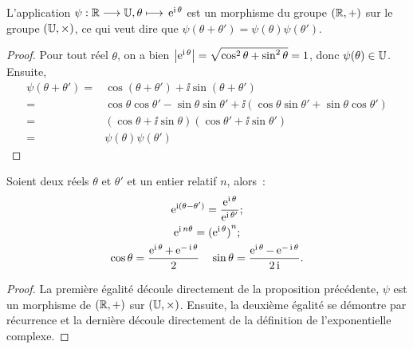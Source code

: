 \begin{prop}
  L'application \(\psi:\mathbb{R} \longrightarrow{} \mathbb{U}, \theta \longmapsto{} \operatorname{e}^{\operatorname{i} \theta}\) est un 
  morphisme du groupe \((\mathbb{R}, + )\) sur le groupe \((\mathbb{U},\times)\), ce qui veut 
  dire que \(\psi(\theta + \theta') = \psi(\theta)\psi(\theta')\).
\end{prop}

\begin{proof}
  Pour tout réel \(\theta\), on a bien \(\left\lvert\operatorname{e}^{\operatorname{i} \theta}\right\rvert = \sqrt{\cos^2 
  \theta + \sin^2 \theta} = 1\), donc \(\psi(\theta) \in{}\mathbb{U}\). Ensuite,
  \begin{align*}
    \psi(\theta  + \theta') = &\cos(\theta  + \theta') + \ii{}\sin(\theta + 
    \theta')\\
    = &\cos \theta \cos \theta' - \sin \theta \sin \theta'  + \ii(\cos 
    \theta \sin \theta' + \sin \theta \cos \theta')\\
    = &(\cos \theta + \ii{}\sin \theta)(\cos \theta' + \ii{}\sin \theta')\\
    = &\psi(\theta) \psi(\theta')
  \end{align*}
\end{proof}

\begin{prop}
  Soient deux réels \(\theta\) et \(\theta'\) et un entier relatif \(n\), 
  alors~:
  \begin{gather}
    \operatorname{e}^{\operatorname{i} (\theta-\theta')} = \frac{\operatorname{e}^{\operatorname{i} \theta}}{\operatorname{e}^{\operatorname{i} \theta'}};\\
    \operatorname{e}^{\operatorname{i} n \theta} = {(\operatorname{e}^{\operatorname{i} \theta})}^n;\\
    \cos \theta = \frac{\operatorname{e}^{\operatorname{i}{}\theta} + \operatorname{e}^{-\operatorname{i}\theta}}{2} \quad \sin 
    \theta = \frac{\operatorname{e}^{\operatorname{i}{}\theta}-\operatorname{e}^{-\operatorname{i}\theta}}{2\operatorname{i}}.
  \end{gather}
\end{prop}

\begin{proof}
  La première égalité découle directement de la proposition précédente, 
  \(\psi\) est un morphisme de \((\mathbb{R}, + )\) sur \((\mathbb{U},\times)\). Ensuite, la 
  deuxième égalité se démontre par récurrence et la dernière découle 
  directement de la définition de l'exponentielle complexe.
\end{proof}

